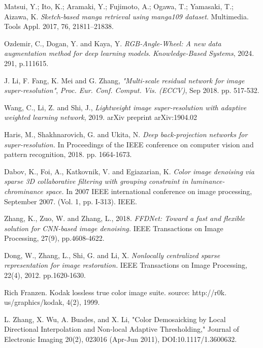 \documentclass[twocolumn]{svjour3}          %
\begin{document}
\begin{thebibliography}{00}
 Matsui, Y.; Ito, K.; Aramaki, Y.; Fujimoto, A.; Ogawa, T.; Yamasaki, T.; Aizawa, K. \textit{Sketch-based manga retrieval using manga109 dataset}. Multimedia. Tools Appl. 2017, 76, 21811–21838.

 Ozdemir, C., Dogan, Y. and Kaya, Y. \textit{RGB-Angle-Wheel: A new data augmentation method for deep learning models}. \textit{Knowledge-Based Systems}, 2024. 291, p.111615.

 J. Li, F. Fang, K. Mei and G. Zhang, \textit{"Multi-scale residual network for image super-resolution"}, \textit{Proc. Eur. Conf. Comput. Vis. (ECCV)}, Sep 2018. pp. 517-532.

 Wang, C., Li, Z. and Shi, J., \textit{Lightweight image super-resolution with adaptive weighted learning network}, 2019. arXiv preprint arXiv:1904.02

 Haris, M., Shakhnarovich, G. and Ukita, N. \textit{Deep back-projection networks for super-resolution.} In Proceedings of the IEEE conference on computer vision and pattern recognition, 2018. pp. 1664-1673.

 Dabov, K., Foi, A., Katkovnik, V. and Egiazarian, K. \textit{Color image denoising via sparse 3D collaborative filtering with grouping constraint in luminance-chrominance space.} In 2007 IEEE international conference on image processing, September 2007. (Vol. 1, pp. I-313). IEEE.

 Zhang, K., Zuo, W. and Zhang, L., 2018. \textit{FFDNet: Toward a fast and flexible solution for CNN-based image denoising.} IEEE Transactions on Image Processing, 27(9), pp.4608-4622.

 Dong, W., Zhang, L., Shi, G. and Li, X. \textit{Nonlocally centralized sparse representation for image restoration.} IEEE Transactions on Image Processing, 22(4),  2012. pp.1620-1630.

 Rich Franzen. Kodak lossless true color image suite. source: http://r0k. us/graphics/kodak, 4(2), 1999.

L. Zhang, X. Wu, A. Buades, and X. Li, "Color Demosaicking by Local Directional Interpolation and Non-local Adaptive Thresholding," Journal of Electronic Imaging 20(2), 023016 (Apr-Jun 2011), DOI:10.1117/1.3600632. 



\end{thebibliography}
\end{document}
